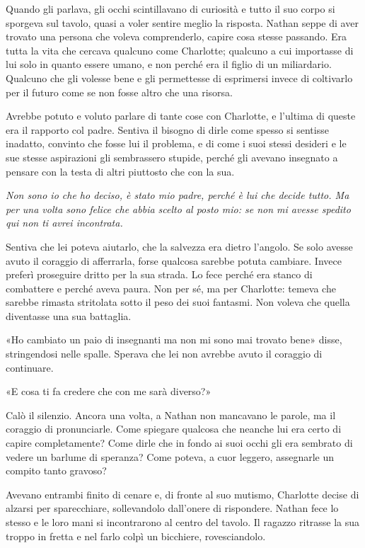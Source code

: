 \documentclass[a4paper,oneside,9pt]{memoir}
\begin{document}
Quando gli parlava, gli occhi scintillavano di curiosità e tutto il suo corpo si sporgeva sul tavolo, quasi a voler
sentire meglio la risposta. Nathan seppe di aver trovato una persona che voleva comprenderlo, capire cosa stesse
passando. Era tutta la vita che cercava qualcuno come Charlotte; qualcuno a cui importasse di lui solo in quanto essere
umano, e non perché era il figlio di un miliardario. Qualcuno che gli volesse bene e gli permettesse di esprimersi
invece di coltivarlo per il futuro come se non fosse altro che una risorsa.

Avrebbe potuto e voluto parlare di tante cose con Charlotte, e l'ultima di queste era il rapporto col padre. Sentiva il
bisogno di dirle come spesso si sentisse inadatto, convinto che fosse lui il problema, e di come i suoi stessi desideri
e le sue stesse aspirazioni gli sembrassero stupide, perché gli avevano insegnato a pensare con la testa di altri
piuttosto che con la sua.

\emph{Non sono io che ho deciso, è stato mio padre, perché è lui che decide tutto. Ma per una volta sono felice che
abbia scelto al posto mio: se non mi avesse spedito qui non ti avrei incontrata.}

Sentiva che lei poteva aiutarlo, che la salvezza era dietro l'angolo. Se solo avesse avuto il coraggio di afferrarla,
forse qualcosa sarebbe potuta cambiare. Invece preferì proseguire dritto per la sua strada. Lo fece perché era stanco
di combattere e perché aveva paura. Non per sé, ma per Charlotte: temeva che sarebbe rimasta stritolata sotto il peso
dei suoi fantasmi. Non voleva che quella diventasse una sua battaglia.

«Ho cambiato un paio di insegnanti ma non mi sono mai trovato bene» disse, stringendosi nelle spalle. Sperava che lei
non avrebbe avuto il coraggio di continuare.

«E cosa ti fa credere che con me sarà diverso?»

Calò il silenzio. Ancora una volta, a Nathan non mancavano le parole, ma il coraggio di pronunciarle. Come spiegare
qualcosa che neanche lui era certo di capire completamente? Come dirle che in fondo ai suoi occhi gli era sembrato di
vedere un barlume di speranza? Come poteva, a cuor leggero, assegnarle un compito tanto gravoso?

Avevano entrambi finito di cenare e, di fronte al suo mutismo, Charlotte decise di alzarsi per sparecchiare,
sollevandolo dall'onere di rispondere. Nathan fece lo stesso e le loro mani si incontrarono al centro del tavolo. Il
ragazzo ritrasse la sua troppo in fretta e nel farlo colpì un bicchiere, rovesciandolo.
\end{document}
